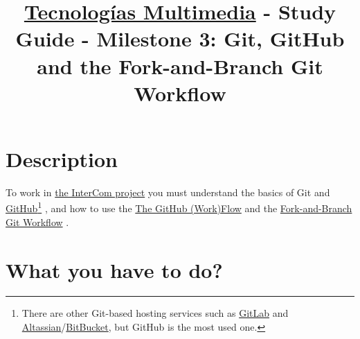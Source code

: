 \title{\href{https://www.ual.es/estudios/grados/presentacion/plandeestudios/asignatura/4015/40154321?idioma=zh_CN}{Tecnologías Multimedia} - Study Guide - Milestone 3: Git, GitHub and the Fork-and-Branch Git Workflow}

\maketitle

\lstset{
  showstringspaces=false,
  upquote=true
}

\section{Description}

To work in
\href{https://github.com/Tecnologias-multimedia/intercom}{the InterCom
  project} \cite{intercom} you must understand the basics of
Git \cite{Git-book} and
\href{https://github.com/}{GitHub}\footnote{There are other Git-based
hosting services such as \href{https://about.gitlab.com/}{GitLab} and
\href{https://www.atlassian.com/git}{Altassian}/\href{https://bitbucket.org/product}{BitBucket},
but GitHub is the most used one.} \cite{GitHub}, and how to use the
\href{https://guides.github.com/introduction/flow/index.html}{The
  GitHub (Work)Flow} and the
\href{https://github.com/vicente-gonzalez-ruiz/fork_and_branch_git_workflow}{Fork-and-Branch
  Git Workflow} \cite{fork-and-branch-git-workflow}.

\section{What you have to do?}

